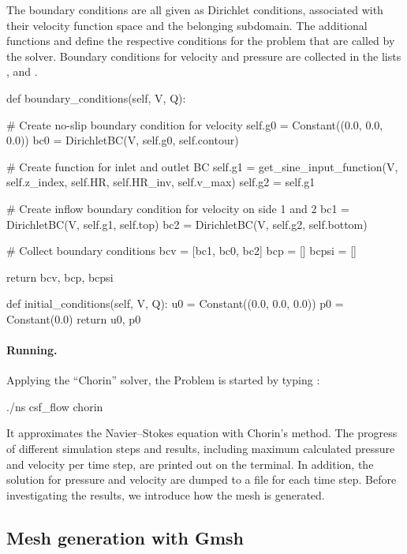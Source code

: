 The boundary conditions are all given as Dirichlet conditions,
associated with their velocity function space and the belonging
subdomain. The additional functions  and
 define the respective conditions for the problem
that are called by the solver. Boundary conditions for velocity and
pressure are collected in the lists ,  and .
\begin{python}
def boundary_conditions(self, V, Q):

    # Create no-slip boundary condition for velocity
    self.g0 = Constant((0.0, 0.0, 0.0))
    bc0 = DirichletBC(V, self.g0, self.contour)

    # Create function for inlet and outlet BC
    self.g1 = get_sine_input_function(V, self.z_index, self.HR, self.HR_inv,
                                      self.v_max)
    self.g2 = self.g1

    # Create inflow boundary condition for velocity on side 1 and 2
    bc1 = DirichletBC(V, self.g1, self.top)
    bc2 = DirichletBC(V, self.g2, self.bottom)

    # Collect boundary conditions
    bcv = [bc1, bc0, bc2]
    bcp = []
    bcpsi = []

    return bcv, bcp, bcpsi

def initial_conditions(self, V, Q):
    u0 = Constant((0.0, 0.0, 0.0))
    p0 = Constant(0.0)
    return u0, p0
\end{python}

\paragraph{Running.}
Applying the ``Chorin'' solver, the Problem is started by typing :
\begin{bash}
./ns csf_flow chorin
\end{bash}

It approximates the Navier--Stokes equation with Chorin's method. The
progress of different simulation steps and results, including maximum
calculated pressure and velocity per time step, are printed out on the
terminal. In addition, the solution for pressure and velocity are
dumped to a file for each time step. Before investigating the results,
we introduce how the mesh is generated.

\subsection{Mesh generation with Gmsh}

